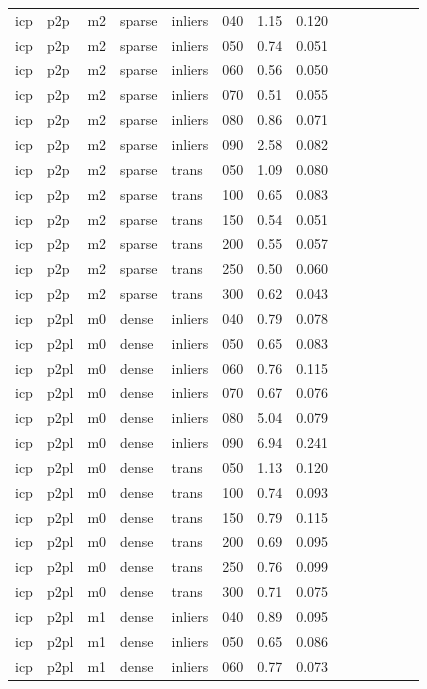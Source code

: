 \begin{table}[htbp]
\begin{tabular}{llllllrrrrrrrr}
  icp & p2p & m2 & sparse & inliers & 040 & 1.15 & 0.120 \\
  icp & p2p & m2 & sparse & inliers & 050 & 0.74 & 0.051 \\
  icp & p2p & m2 & sparse & inliers & 060 & 0.56 & 0.050 \\
  icp & p2p & m2 & sparse & inliers & 070 & 0.51 & 0.055 \\
  icp & p2p & m2 & sparse & inliers & 080 & 0.86 & 0.071 \\
  icp & p2p & m2 & sparse & inliers & 090 & 2.58 & 0.082 \\
  icp & p2p & m2 & sparse & trans & 050 & 1.09 & 0.080 \\
  icp & p2p & m2 & sparse & trans & 100 & 0.65 & 0.083 \\
  icp & p2p & m2 & sparse & trans & 150 & 0.54 & 0.051 \\
  icp & p2p & m2 & sparse & trans & 200 & 0.55 & 0.057 \\
  icp & p2p & m2 & sparse & trans & 250 & 0.50 & 0.060 \\
  icp & p2p & m2 & sparse & trans & 300 & 0.62 & 0.043 \\
  icp & p2pl & m0 & dense & inliers & 040 & 0.79 & 0.078 \\
  icp & p2pl & m0 & dense & inliers & 050 & 0.65 & 0.083 \\
  icp & p2pl & m0 & dense & inliers & 060 & 0.76 & 0.115 \\
  icp & p2pl & m0 & dense & inliers & 070 & 0.67 & 0.076 \\
  icp & p2pl & m0 & dense & inliers & 080 & 5.04 & 0.079 \\
  icp & p2pl & m0 & dense & inliers & 090 & 6.94 & 0.241 \\
  icp & p2pl & m0 & dense & trans & 050 & 1.13 & 0.120 \\
  icp & p2pl & m0 & dense & trans & 100 & 0.74 & 0.093 \\
  icp & p2pl & m0 & dense & trans & 150 & 0.79 & 0.115 \\
  icp & p2pl & m0 & dense & trans & 200 & 0.69 & 0.095 \\
  icp & p2pl & m0 & dense & trans & 250 & 0.76 & 0.099 \\
  icp & p2pl & m0 & dense & trans & 300 & 0.71 & 0.075 \\
  icp & p2pl & m1 & dense & inliers & 040 & 0.89 & 0.095 \\
  icp & p2pl & m1 & dense & inliers & 050 & 0.65 & 0.086 \\
  icp & p2pl & m1 & dense & inliers & 060 & 0.77 & 0.073 \\

\end{tabular}
\end{table}
